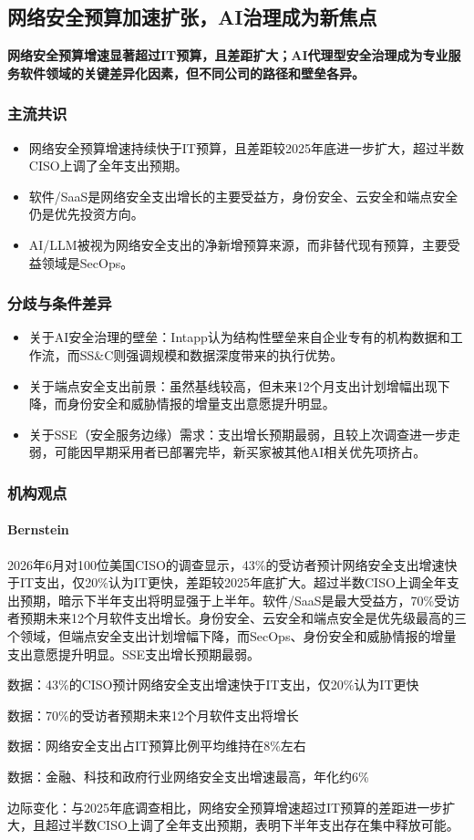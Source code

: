 \documentclass[11pt]{ctexart}
\begin{document}
\subsection{网络安全预算加速扩张，AI治理成为新焦点}
\textbf{网络安全预算增速显著超过IT预算，且差距扩大；AI代理型安全治理成为专业服务软件领域的关键差异化因素，但不同公司的路径和壁垒各异。}
\subsubsection*{主流共识}
\begin{itemize}
  \item 网络安全预算增速持续快于IT预算，且差距较2025年底进一步扩大，超过半数CISO上调了全年支出预期。
  \item 软件/SaaS是网络安全支出增长的主要受益方，身份安全、云安全和端点安全仍是优先投资方向。
  \item AI/LLM被视为网络安全支出的净新增预算来源，而非替代现有预算，主要受益领域是SecOps。
\end{itemize}
\subsubsection*{分歧与条件差异}
\begin{itemize}
  \item 关于AI安全治理的壁垒：Intapp认为结构性壁垒来自企业专有的机构数据和工作流，而SS\&C则强调规模和数据深度带来的执行优势。
  \item 关于端点安全支出前景：虽然基线较高，但未来12个月支出计划增幅出现下降，而身份安全和威胁情报的增量支出意愿提升明显。
  \item 关于SSE（安全服务边缘）需求：支出增长预期最弱，且较上次调查进一步走弱，可能因早期采用者已部署完毕，新买家被其他AI相关优先项挤占。
\end{itemize}
\subsubsection*{机构观点}
\paragraph{Bernstein} 2026年6月对100位美国CISO的调查显示，43\%的受访者预计网络安全支出增速快于IT支出，仅20\%认为IT更快，差距较2025年底扩大。超过半数CISO上调全年支出预期，暗示下半年支出将明显强于上半年。软件/SaaS是最大受益方，70\%受访者预期未来12个月软件支出增长。身份安全、云安全和端点安全是优先级最高的三个领域，但端点安全支出计划增幅下降，而SecOps、身份安全和威胁情报的增量支出意愿提升明显。SSE支出增长预期最弱。
{\small\color{refgray}数据：43\%的CISO预计网络安全支出增速快于IT支出，仅20\%认为IT更快\par}
{\small\color{refgray}数据：70\%的受访者预期未来12个月软件支出将增长\par}
{\small\color{refgray}数据：网络安全支出占IT预算比例平均维持在8\%左右\par}
{\small\color{refgray}数据：金融、科技和政府行业网络安全支出增速最高，年化约6\%\par}
{\small\color{refgray}边际变化：与2025年底调查相比，网络安全预算增速超过IT预算的差距进一步扩大，且超过半数CISO上调了全年支出预期，表明下半年支出存在集中释放可能。\par}
\end{document}
